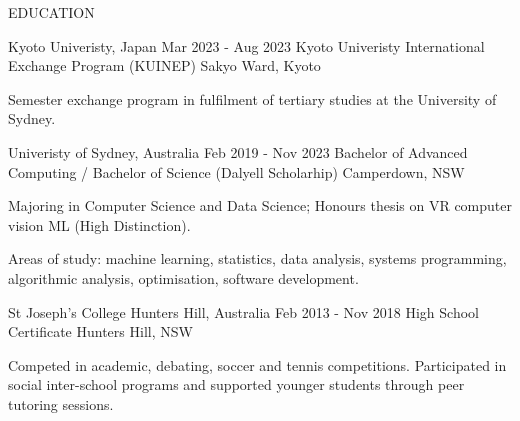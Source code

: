 
\begin{ResumeSection}{EDUCATION}

    \begin{DatedField}
        {Kyoto Univeristy, Japan}
        {Mar 2023 - Aug 2023}
        {Kyoto Univeristy International Exchange Program (KUINEP)}
        {Sakyo Ward, Kyoto}
        \item Semester exchange program in fulfilment of tertiary studies at the University of Sydney.
    \end{DatedField}

    \begin{DatedField}
        {Univeristy of Sydney, Australia}
        {Feb 2019 - Nov 2023}
        {Bachelor of Advanced Computing / Bachelor of Science (Dalyell Scholarhip)}
        {Camperdown, NSW}
        \item Majoring in Computer Science and Data Science; Honours thesis on VR computer vision ML (High Distinction).
        \item Areas of study: machine learning, statistics, data analysis, systems programming, algorithmic analysis, optimisation, software development.
    \end{DatedField}

    \begin{DatedField}
        {St Joseph's College Hunters Hill, Australia}
        {Feb 2013 - Nov 2018}
        {High School Certificate}
        {Hunters Hill, NSW}
        \item Competed in academic, debating, soccer and tennis competitions. Participated in social inter-school programs and supported younger students through peer tutoring sessions.
    \end{DatedField}
    
\end{ResumeSection}